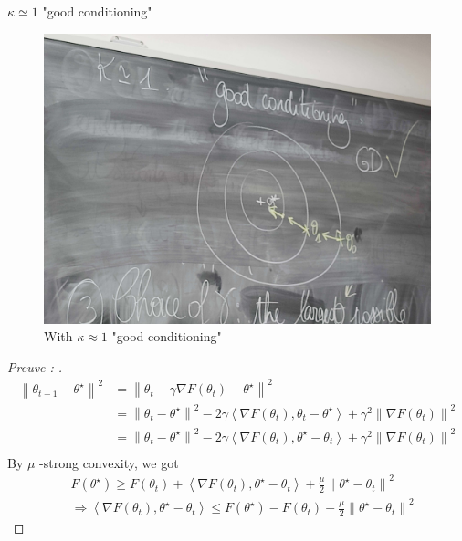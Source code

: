 \begin{note}
    $\kappa \simeq 1$ "good conditioning"
    \begin{figure}[!h]
        \centering
        \includegraphics[width=.75\textwidth]{figs/good_kappa.jpg}
        \caption{With $ \kappa \approx 1 $ "good conditioning" }
    \end{figure}

    \begin{proof}[Preuve : ]
        \begin{align*}
            \left\| \theta _{t+1} - \theta ^\star  \right\| ^2 
                &= \left\| \theta _t - \gamma \nabla F(\theta _t) - \theta ^\star  \right\| ^2 \\
                &= \left\| \theta _t - \theta ^\star  \right\| ^2 - 2 \gamma \left\langle \nabla F (\theta _t), \theta _t - \theta ^\star  \right\rangle + \gamma ^2 \left\| \nabla F(\theta _t) \right\| ^2 \\
                &= \left\| \theta _t - \theta ^\star  \right\| ^2 - 2 \gamma \left\langle \nabla F (\theta _t), \theta ^\star - \theta _t \right\rangle + \gamma ^2 \left\| \nabla F(\theta _t) \right\| ^2 \\
        \end{align*}
        By $ \mu  $ -strong convexity, we got 
        \begin{align*}
            &F(\theta ^\star ) \geq F(\theta _t) + \left\langle \nabla F(\theta _t) , \theta ^\star - \theta _t  \right\rangle + \frac{\mu }{2}\left\| \theta ^\star - \theta _t \right\| ^2 \\
            & \Rightarrow \left\langle \nabla F(\theta _t) , \theta ^\star - \theta _t \right\rangle \leq F(\theta ^\star ) - F(\theta _t) - \frac{\mu }{2}\left\| \theta ^\star -  \theta _t \right\| ^2
        \end{align*}
        

\end{proof}
\end{note}

